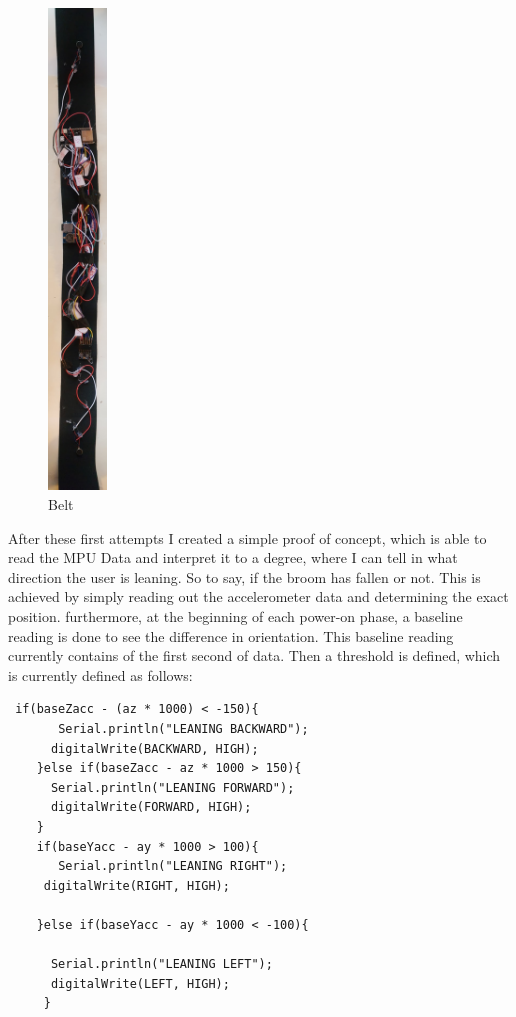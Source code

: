 \begin{figure}
\centering
\includegraphics[width=0.14\textwidth]{images/belt.jpg}
    \caption{Belt}
        \label{fig:Belt}
\end{figure}

After these first attempts I created a simple proof of concept, which is able to read the MPU Data and interpret it to a degree, where I can tell in what direction the user is leaning. So to say, if the broom has fallen or not. This is achieved by simply reading out the accelerometer data and determining the exact position. furthermore, at the beginning of each power-on phase, a baseline reading is done to see the difference in orientation. This baseline reading currently contains of the first second of data. Then a threshold is defined, which is currently defined as follows:

\begin{lstlisting}
 if(baseZacc - (az * 1000) < -150){
       Serial.println("LEANING BACKWARD");
      digitalWrite(BACKWARD, HIGH);
    }else if(baseZacc - az * 1000 > 150){
      Serial.println("LEANING FORWARD");
      digitalWrite(FORWARD, HIGH);
    }
    if(baseYacc - ay * 1000 > 100){
       Serial.println("LEANING RIGHT");
     digitalWrite(RIGHT, HIGH);

    }else if(baseYacc - ay * 1000 < -100){
      
      Serial.println("LEANING LEFT");
      digitalWrite(LEFT, HIGH);
     }
\end{lstlisting}

